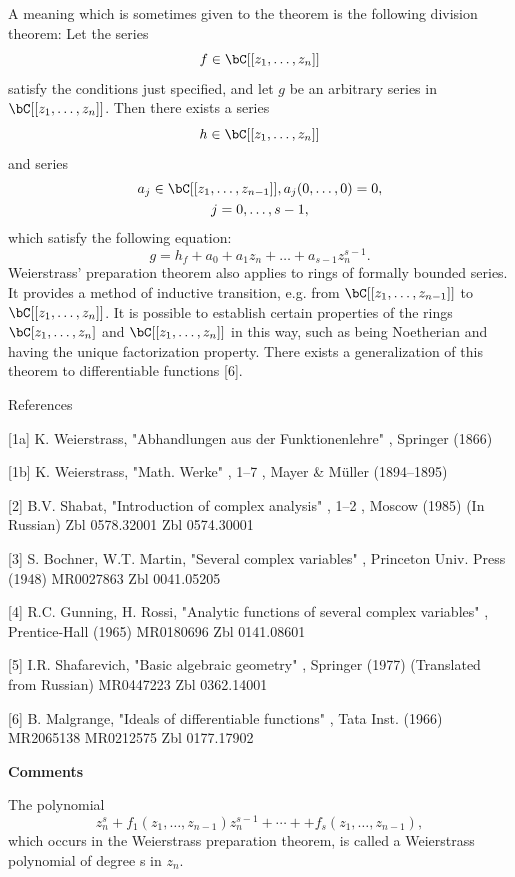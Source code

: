 \documentclass[lang=cn,12pt,fontset=none,a4paper]{beautybook}
\begin{document}
A meaning which is sometimes given to the theorem is the following division theorem: Let the series
$$
f\in \bC[[z_1,\dots,z_n]]
$$
satisfy the conditions just specified, and let $g$ be an arbitrary series in $\bC[[z_1,\dots,z_n]]$. Then there exists a series
$$
h\in \bC[[z_1,\dots,z_n]]
$$
and series
$$
\begin{gathered}
   a_j\in \bC[[z_1,\dots,z_{n-1}]],  a_j (0,\dots,0)=0,\\
j=0,\dots,s-1,
\end{gathered}
$$
which satisfy the following equation:
$$
g=h_f+a_0+a_1z_n+\dots+a_{s-1}z^{s-1}_n.
$$
Weierstrass' preparation theorem also applies to rings of formally bounded series. It provides a method of inductive transition, e.g. from $\bC[[z_1,\dots,z_{n-1}]]$
 to $\bC[[z_1,\dots,z_n]]$. It is possible to establish certain properties of the rings $\bC[z_1,\dots,z_n]$ and $\bC[[z_1,\dots,z_n]]$ in this way, such as being Noetherian and having the unique factorization property. There exists a generalization of this theorem to differentiable functions [6].

References

[1a]	K. Weierstrass, "Abhandlungen aus der Funktionenlehre" , Springer (1866)

[1b]	K. Weierstrass, "Math. Werke" , 1–7 , Mayer \& Müller (1894–1895)

[2]	B.V. Shabat, "Introduction of complex analysis" , 1–2 , Moscow (1985) (In Russian) Zbl 0578.32001 Zbl 0574.30001

[3]	S. Bochner, W.T. Martin, "Several complex variables" , Princeton Univ. Press (1948) MR0027863 Zbl 0041.05205

[4]	R.C. Gunning, H. Rossi, "Analytic functions of several complex variables" , Prentice-Hall (1965) MR0180696 Zbl 0141.08601

[5]	I.R. Shafarevich, "Basic algebraic geometry" , Springer (1977) (Translated from Russian) MR0447223 Zbl 0362.14001

[6]	B. Malgrange, "Ideals of differentiable functions" , Tata Inst. (1966) MR2065138 MR0212575 Zbl 0177.17902

\textbf{Comments}

The polynomial
$$
z^s_n+f_1(z_1,\dots,z_{n-1}) z^{s-1}_n+⋯+
+f_s(z_1,\dots,z_{n-1}),
$$
which occurs in the Weierstrass preparation theorem, is called a Weierstrass polynomial of degree s
 in $z_n$.

\end{document}
